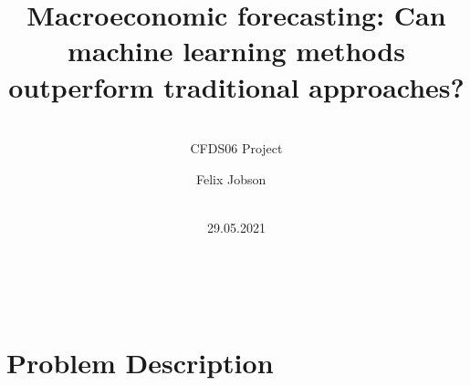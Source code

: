 \documentclass[mathserif]{beamer}
\begin{document}
















\title{\textbf{Macroeconomic forecasting: Can machine learning methods outperform traditional approaches?}}
\subtitle{\ \\CFDS06 Project}

\author{Felix Jobson
\ \\}
\date{\ \\ 29.05.2021} 

{
\begin{frame}
\frametitle{~}
\maketitle 
\end{frame}
}
\addtocounter{framenumber}{-1}










{
\section{Problem Description} 
}
\addtocounter{framenumber}{-1}
\end{document}
